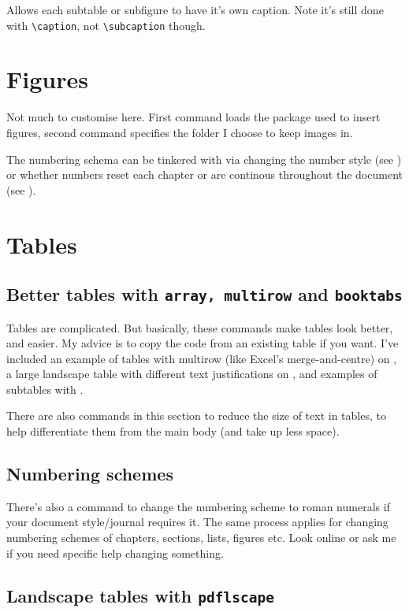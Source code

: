 \documentclass[../main]{subfiles}
\begin{document}
Allows each subtable or subfigure to have it's own caption. Note it's still done with \verb|\caption|, not \verb|\subcaption| though.

\section{Figures}

Not much to customise here. First command loads the package used to insert figures, second command specifies the folder I choose to keep images in.

The numbering schema can be tinkered with via changing the number style (see ) or whether numbers reset each chapter or are continous throughout the document (see ).

\section{Tables}

\subsection{Better tables with \texttt{array, multirow} and \texttt{booktabs}} 

Tables are complicated. But basically, these commands make tables look better, and easier. My advice is to copy the code from an existing table if you want. I've included an example of tables with multirow (like Excel's merge-and-centre) on , a large landscape table with different text justifications on , and examples of subtables with .

There are also commands in this section to reduce the size of text in tables, to help differentiate them from the main body (and take up less space). 

\subsection{Numbering schemes}\label{sub:numbering_schemes}
There's also a command to change the numbering scheme to roman numerals if your document style/journal requires it. The same process applies for changing numbering schemes of chapters, sections, lists, figures etc. Look online or ask me if you need specific help changing something.

\subsection{Landscape tables with \texttt{pdflscape}}
\end{document}
